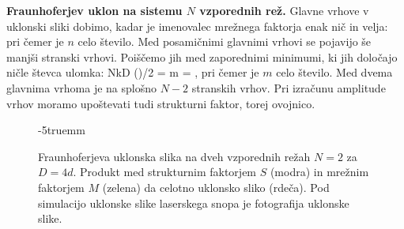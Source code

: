 \begin{example}{\bf Fraunhoferjev uklon na sistemu $N$ vzporednih rež.}
Glavne vrhove v uklonski sliki dobimo, kadar je imenovalec mrežnega faktorja enak nič in velja:
pri čemer je $n$ celo število. Med posamičnimi glavnimi vrhovi se pojavijo še manjši
stranski vrhovi. Poiščemo jih med zaporednimi minimumi, ki jih določajo ničle števca
ulomka:
\beq
NkD \sin(\vartheta)/2 = m\pi \qquad {} \qquad \sin \vartheta = ,
\label{eq:05_29}
\eeq
pri čemer je $m$ celo število. Med dvema glavnima vrhoma je na splošno
$N-2$ stranskih vrhov. Pri izračunu amplitude vrhov moramo upoštevati
tudi strukturni faktor, torej ovojnico.
\begin{figure}[ht]
\centering
\def\svgwidth{140truemm} 

\caption{Fraunhoferjeva uklonska slika na dveh vzporednih režah $N=2$ za $D=4d$. 
Produkt med strukturnim faktorjem $S$ (modra) in mrežnim
faktorjem $M$ (zelena) da celotno uklonsko sliko (rdeča). Pod simulacijo uklonske 
slike laserskega snopa je fotografija uklonske slike.}
\label{fig:05_2rezi}
\vglue-5truemm
\end{figure}


\end{example}
